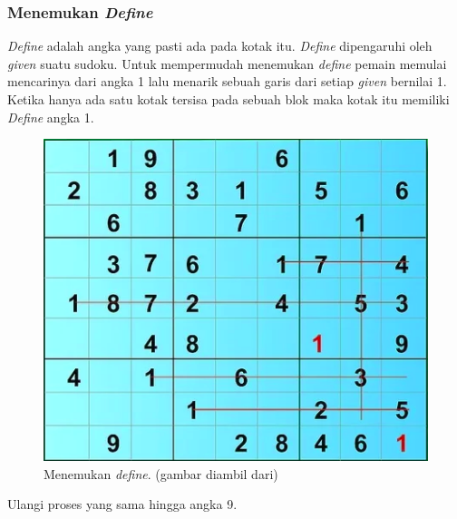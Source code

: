 \subsubsection{Menemukan \textit{Define}}

\textit{Define} adalah angka yang pasti ada pada kotak itu. \textit{Define} dipengaruhi oleh \textit{given} suatu sudoku. Untuk mempermudah menemukan \textit{define} pemain memulai mencarinya dari angka 1 lalu menarik sebuah garis dari setiap \textit{given} bernilai 1. Ketika hanya ada satu kotak tersisa pada sebuah blok maka kotak itu memiliki \textit{Define} angka 1. 

\begin{figure}[H]
	\begin{centering}
		\includegraphics[scale=0.7]{gambar/solve2}
		
		\caption{Menemukan \textit{define}. (gambar diambil dari)}
	\end{centering}
\end{figure}

Ulangi proses yang sama hingga angka 9.


